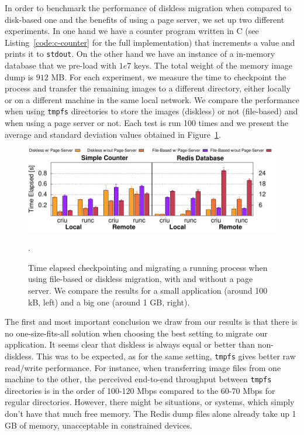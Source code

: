 In order to benchmark the performance of diskless migration when compared to disk-based one and the benefits of using a page server, we set up two different experiments.
In one hand we have a counter program written in C (see Listing~\ref{code:c-counter} for the full implementation) that increments a value and prints it to \texttt{stdout}.
On the other hand we have an instance of a \redis in-memory database that we pre-load with $1e7$ keys.
The total weight of the memory image dump is $912$ MB.
For each experiment, we measure the time to checkpoint the process and transfer the remaining images to a different directory, either locally or on a different machine in the same local network.
We compare the performance when using \texttt{tmpfs} directories to store the images (diskless) or not (file-based) and when using a page server or not.
Each test is run 100 times and we present the average and standard deviation values obtained in Figure~\ref{fig:diskless-migration-microbenchmark}.

\begin{figure}[h!]
    \centering
    \includegraphics[width=.8\textwidth]{figs/diskless-migration-microbenchmark/diskless_migration_microbenchmark.pdf}
    \caption[Size of the memory image for iterative dumps.]{Time elapsed checkpointing and migrating a running process when using file-based or diskless migration, with and without a page server. We compare the results for a small application (around 100 kB, left) and a big one (around 1 GB, right).\label{fig:diskless-migration-microbenchmark}}.
\end{figure}

The first and most important conclusion we draw from our results is that there is no one-size-fits-all solution when choosing the best setting to migrate our application.
It seems clear that diskless is always equal or better than non-diskless.
This was to be expected, as for the same setting, \texttt{tmpfs} gives better raw read/write performance.
For instance, when transferring image files from one machine to the other, the perceived end-to-end throughput between \texttt{tmpfs} directories is in the order of 100-120 Mbps compared to the 60-70 Mbps for regular directories.
However, there might be situations, or systems, which simply don't have that much free memory.
The Redis dump files alone already take up 1 GB of memory, unacceptable in constrained devices.

